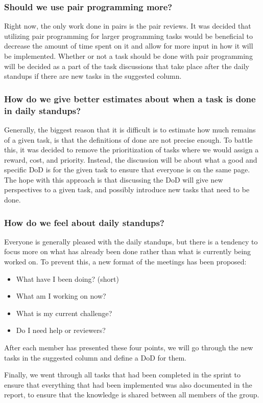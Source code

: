 \subsubsection{Should we use pair programming more?}
Right now, the only work done in pairs is the pair reviews.
It was decided that utilizing pair programming for larger programming tasks would be beneficial to decrease the amount of time spent on it and allow for more input in how it will be implemented.
Whether or not a task should be done with pair programming will be decided as a part of the task discussions that take place after the daily standups if there are new tasks in the suggested column.

\subsubsection{How do we give better estimates about when a task is done in daily standups?}
Generally, the biggest reason that it is difficult is to estimate how much remains of a given task, is that the definitions of done are not precise enough.
To battle this, it was decided to remove the prioritization of tasks where we would assign a reward, cost, and priority.
Instead, the discussion will be about what a good and specific DoD is for the given task to ensure that everyone is on the same page.
The hope with this approach is that discussing the DoD will give new perspectives to a given task, and possibly introduce new tasks that need to be done.\\

\subsubsection{How do we feel about daily standups?}
Everyone is generally pleased with the daily standups, but there is a tendency to focus more on what has already been done rather than what is currently being worked on.
To prevent this, a new format of the meetings has been proposed:

\begin{itemize}
	\item{What have I been doing? (short)}
	\item{What am I working on now?}
	\item{What is my current challenge?}
	\item{Do I need help or reviewers?}
\end{itemize}

After each member has presented these four points, we will go through the new tasks in the suggested column and define a DoD for them.

Finally, we went through all tasks that had been completed in the sprint to ensure that everything that had been implemented was also documented in the report, to ensure that the knowledge is shared between all members of the group.